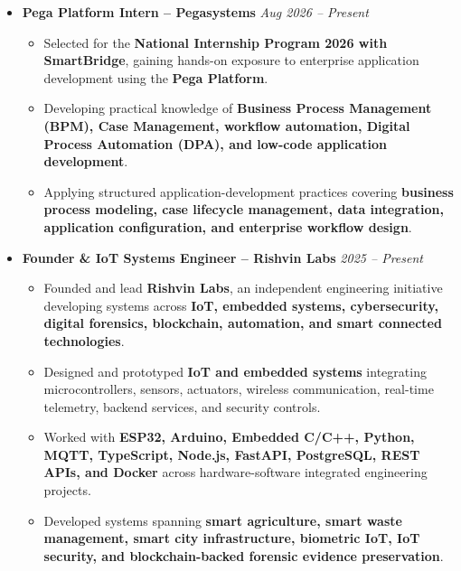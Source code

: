 \documentclass[a4paper,11pt]{article}
\newcommand{\resumeItem}[1]{
    \item \small{#1 \vspace{-2pt}}
}
\begin{document}
\begin{itemize}[leftmargin=0in, label={}]

\item
\textbf{Pega Platform Intern -- Pegasystems}
\hfill \textit{Aug 2026 -- Present}

\begin{itemize}[leftmargin=*]

\resumeItem{Selected for the \textbf{National Internship Program 2026 with SmartBridge}, gaining hands-on exposure to enterprise application development using the \textbf{Pega Platform}.}

\resumeItem{Developing practical knowledge of \textbf{Business Process Management (BPM), Case Management, workflow automation, Digital Process Automation (DPA), and low-code application development}.}

\resumeItem{Applying structured application-development practices covering \textbf{business process modeling, case lifecycle management, data integration, application configuration, and enterprise workflow design}.}

\end{itemize}

\vspace{4pt}

\item
\textbf{Founder \& IoT Systems Engineer -- Rishvin Labs}
\hfill \textit{2025 -- Present}

\begin{itemize}[leftmargin=*]

\resumeItem{Founded and lead \textbf{Rishvin Labs}, an independent engineering initiative developing systems across \textbf{IoT, embedded systems, cybersecurity, digital forensics, blockchain, automation, and smart connected technologies}.}

\resumeItem{Designed and prototyped \textbf{IoT and embedded systems} integrating microcontrollers, sensors, actuators, wireless communication, real-time telemetry, backend services, and security controls.}

\resumeItem{Worked with \textbf{ESP32, Arduino, Embedded C/C++, Python, MQTT, TypeScript, Node.js, FastAPI, PostgreSQL, REST APIs, and Docker} across hardware-software integrated engineering projects.}

\resumeItem{Developed systems spanning \textbf{smart agriculture, smart waste management, smart city infrastructure, biometric IoT, IoT security, and blockchain-backed forensic evidence preservation}.}


\end{itemize}
\end{itemize}
\end{document}
